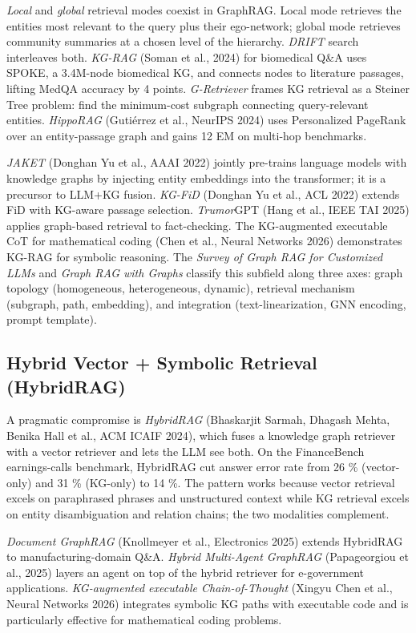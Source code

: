 \documentclass{article}
\begin{document}
\emph{Local} and \emph{global} retrieval modes coexist in GraphRAG. Local mode retrieves the entities most relevant to the query plus their ego-network; global mode retrieves community summaries at a chosen level of the hierarchy. \emph{DRIFT} search interleaves both. \emph{KG-RAG} (Soman et al., 2024) for biomedical Q\&A uses SPOKE, a 3.4M-node biomedical KG, and connects nodes to literature passages, lifting MedQA accuracy by 4 points. \emph{G-Retriever} \citep{he2024gretrieverretrieva} frames KG retrieval as a Steiner Tree problem: find the minimum-cost subgraph connecting query-relevant entities. \emph{HippoRAG} (Gutiérrez et al., NeurIPS 2024) uses Personalized PageRank over an entity-passage graph and gains 12 EM on multi-hop benchmarks.

\emph{JAKET} (Donghan Yu et al., AAAI 2022) jointly pre-trains language models with knowledge graphs by injecting entity embeddings into the transformer; it is a precursor to LLM+KG fusion. \emph{KG-FiD} (Donghan Yu et al., ACL 2022) extends FiD with KG-aware passage selection. \emph{Trumor}GPT (Hang et al., IEEE TAI 2025) applies graph-based retrieval to fact-checking. The KG-augmented executable CoT for mathematical coding (Chen et al., Neural Networks 2026) demonstrates KG-RAG for symbolic reasoning. The \emph{Survey of Graph RAG for Customized LLMs} \citep{zhang20252025} and \emph{Graph RAG with Graphs} \citep{han20252025} classify this subfield along three axes: graph topology (homogeneous, heterogeneous, dynamic), retrieval mechanism (subgraph, path, embedding), and integration (text-linearization, GNN encoding, prompt template).

\subsection{Hybrid Vector + Symbolic Retrieval (HybridRAG)}\label{hybrid-vector-symbolic-retrieval-hybridrag}

A pragmatic compromise is \emph{HybridRAG} (Bhaskarjit Sarmah, Dhagash Mehta, Benika Hall et al., ACM ICAIF 2024), which fuses a knowledge graph retriever with a vector retriever and lets the LLM see both. On the FinanceBench earnings-calls benchmark, HybridRAG cut answer error rate from 26 \% (vector-only) and 31 \% (KG-only) to 14 \%. The pattern works because vector retrieval excels on paraphrased phrases and unstructured context while KG retrieval excels on entity disambiguation and relation chains; the two modalities complement.

\emph{Document GraphRAG} (Knollmeyer et al., Electronics 2025) extends HybridRAG to manufacturing-domain Q\&A. \emph{Hybrid Multi-Agent GraphRAG} (Papageorgiou et al., 2025) layers an agent on top of the hybrid retriever for e-government applications. \emph{KG-augmented executable Chain-of-Thought} (Xingyu Chen et al., Neural Networks 2026) integrates symbolic KG paths with executable code and is particularly effective for mathematical coding problems.
\end{document}
